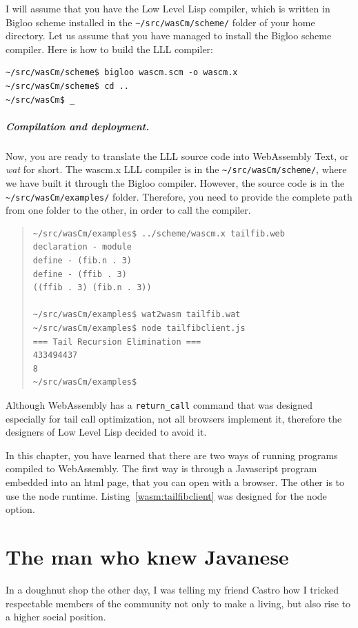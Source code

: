 \documentclass[a4paper,12pt]{book}
\begin{document}
I will assume that you have the Low Level Lisp compiler,
which is written in Bigloo scheme installed in the
\verb|~/src/wasCm/scheme/| folder of your home directory.
Let us assume that you have managed to install the
Bigloo scheme compiler. Here is how to build the
LLL compiler:
\begin{verbatim}
~/src/wasCm/scheme$ bigloo wascm.scm -o wascm.x
~/src/wasCm/scheme$ cd ..
~/src/wasCm$ _
\end{verbatim}

\paragraph{Compilation and deployment.}
Now, you are ready to translate the LLL source code into
WebAssembly Text, or {\em wat} for short. The wascm.x
LLL compiler is in the \verb|~/src/wasCm/scheme/|, where
we have built it through the Bigloo compiler. However,
the source code is in the \verb|~/src/wasCm/examples/|
folder. Therefore, you need to provide the complete path
from one folder to the other, in order to call the
compiler.
\begin{quote}
\begin{verbatim}
~/src/wasCm/examples$ ../scheme/wascm.x tailfib.web
declaration - module
define - (fib.n . 3)
define - (ffib . 3)
((ffib . 3) (fib.n . 3))

~/src/wasCm/examples$ wat2wasm tailfib.wat
~/src/wasCm/examples$ node tailfibclient.js
=== Tail Recursion Elimination ===
433494437
8
~/src/wasCm/examples$
\end{verbatim}
\end{quote}


 Although WebAssembly has
a \verb|return_call| command that was designed especially
for tail call optimization, not all browsers implement
it, therefore the designers of Low Level Lisp decided
to avoid it.

In this chapter, you have learned that there are two
ways of running programs compiled to WebAssembly.
The first way is through a Javascript program embedded
into an html page, that you can open with a browser.
The other is to use the node runtime.
Listing~\ref{wasm:tailfibclient} was designed for the
node option.



\chapter{The man who knew Javanese}
In a doughnut shop the other day,
I was telling my friend Castro
how I tricked respectable members of the
community not only to make a living,
but also rise to a higher social position.
\end{document}
